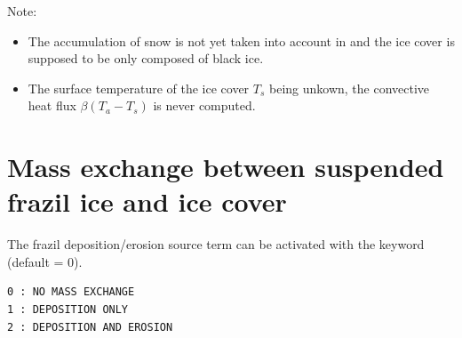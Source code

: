 \begin{WarningBlock}{Note:}
\begin{itemize}
    \item The accumulation of snow is not yet taken into account in \khione and the ice cover is supposed to be only composed of black ice.
    \item The surface temperature of the ice cover $T_s$ being unkown, the convective heat flux $\beta (T_a-T_s)$ is never computed.
\end{itemize}
\end{WarningBlock}


\section{Mass exchange between suspended frazil ice and ice cover}
\label{section:mass_exchanges}

The frazil deposition/erosion source term can be activated with the keyword  (default = 0).
\begin{lstlisting}
0 : NO MASS EXCHANGE
1 : DEPOSITION ONLY
2 : DEPOSITION AND EROSION
\end{lstlisting}


